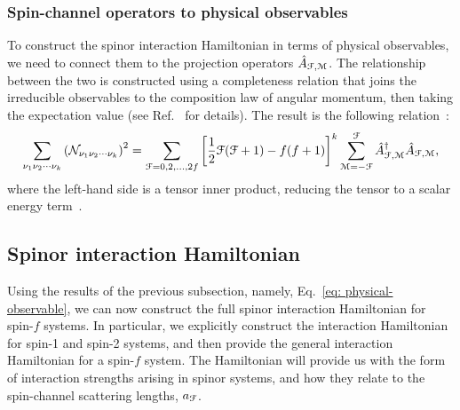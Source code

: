 \subsubsection{Spin-channel operators to physical observables}
To construct the spinor interaction Hamiltonian in terms of physical
observables, we need to connect them to the projection operators
\(\hat{A}_{\EuScript{F}, \EuScript{M}}\).
The relationship between the two is constructed using a completeness relation
that joins the irreducible observables to the composition law of angular
momentum, then taking the expectation value (see Ref.~\cite{Kawaguchi2012} for
details).
The result is the following relation~\cite{Symes2019}:
\begin{align}\label{eq: physical-observable}
    \sum_{\nu_1\nu_2\cdots\nu_k}{(\mathcal{N}_{\nu_1\nu_2\cdots\nu_k})}^2 =
    \sum_{\EuScript{F} = 0, 2, \ldots, 2f}{\left[
        \frac{1}{2}\EuScript{F}(\EuScript{F} + 1) - f(f+1)
    \right]}^k \sum_{\EuScript{M} = -\EuScript{F}}^{\EuScript{F}}
    \hat{A}^\dagger_{\EuScript{F}, \EuScript{M}}
    \hat{A}_{\EuScript{F}, \EuScript{M}},
\end{align}
where the left-hand side is a tensor inner product, reducing the tensor to a
scalar energy term~\cite{Kawaguchi2012}.

\subsection{Spinor interaction Hamiltonian}
Using the results of the previous subsection, namely,
Eq.~\eqref{eq: physical-observable}, we can now construct the full spinor
interaction Hamiltonian for spin-\(f\) systems.
In particular, we explicitly construct the interaction Hamiltonian for spin-1
and spin-2 systems, and then provide the general interaction Hamiltonian for
a spin-\(f\) system.
The Hamiltonian will provide us with the form of interaction strengths arising
in spinor systems, and how they relate to the spin-channel scattering lengths,
\(a_\EuScript{F}\).

